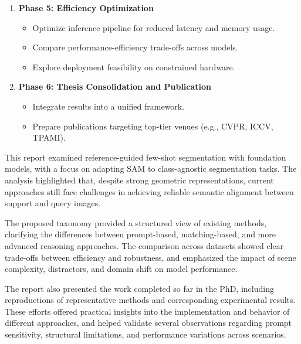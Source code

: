 \documentclass[journal,12pt,onecolumn,draftclsnofoot]{IEEEtran}
\makeatletter
\newcounter{chapter}
\renewcommand{\thechapter}{\arabic{chapter}}
\newcommand{\my@chapter}[1]{%
    \cleardoublepage 
    \par\vspace*{4ex}%
    \refstepcounter{chapter}%
    \setcounter{section}{0}%
    \setcounter{figure}{0}%
    \setcounter{table}{0}%
    \setcounter{equation}{0}%
    \addcontentsline{toc}{chapter}{\protect\numberline{\thechapter}#1}%
    \addtocontents{lof}{\protect\addvspace{10\p@}}%
    \addtocontents{lot}{\protect\addvspace{10\p@}}%
    {\noindent\normalfont\Huge\bfseries Chapter \thechapter \par\vspace{2ex}\noindent\huge #1\par}%
    \@afterheading
    \vspace*{4ex}%
}
\newcommand{\my@schapter}[1]{%
    \cleardoublepage
    \par\vspace*{4ex}%
    {\noindent\normalfont\Huge\bfseries #1\par}%
    \@afterheading
    \vspace*{4ex}%
}
\def\chapter{\@ifstar{\my@schapter}{\my@chapter}}
\makeatother
\begin{document}
\begin{enumerate}
    \item \textbf{Phase 5: Efficiency Optimization}
    \begin{itemize}
        \item Optimize inference pipeline for reduced latency and memory usage.
        \item Compare performance-efficiency trade-offs across models.
        \item Explore deployment feasibility on constrained hardware.
    \end{itemize}
    
    \item \textbf{Phase 6: Thesis Consolidation and Publication}
    \begin{itemize}
        \item Integrate results into a unified framework.
        \item Prepare publications targeting top-tier venues (e.g., CVPR, ICCV, TPAMI).
    \end{itemize}
\end{enumerate}


\chapter{Conclusion}

This report examined reference-guided few-shot segmentation with foundation models, with a focus on adapting SAM to class-agnostic segmentation tasks. The analysis highlighted that, despite strong geometric representations, current approaches still face challenges in achieving reliable semantic alignment between support and query images.  

The proposed taxonomy provided a structured view of existing methods, clarifying the differences between prompt-based, matching-based, and more advanced reasoning approaches. The comparison across datasets showed clear trade-offs between efficiency and robustness, and emphasized the impact of scene complexity, distractors, and domain shift on model performance.  

The report also presented the work completed so far in the PhD, including reproductions of representative methods and corresponding experimental results. These efforts offered practical insights into the implementation and behavior of different approaches, and helped validate several observations regarding prompt sensitivity, structural limitations, and performance variations across scenarios.  
\end{document}
